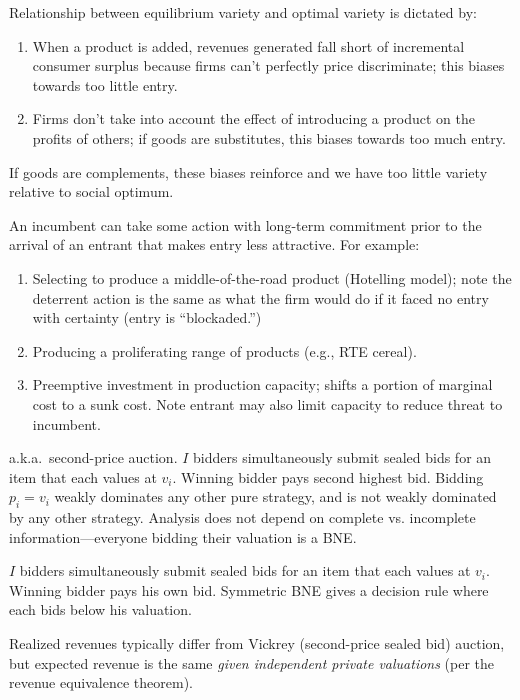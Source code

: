 \documentclass[8pt,letterpaper, landscape]{extarticle} %
\begin{document}
\begin{multicols}{3}
\begin{description}
Relationship between equilibrium variety and optimal variety is dictated by:
\begin{enumerate}
\item When a product is added, revenues generated fall short of incremental consumer surplus because firms can't perfectly price discriminate; this biases towards too little entry.
\item Firms don't take into account the effect of introducing a product on the profits of others; if goods are substitutes, this biases towards too much entry.
\end{enumerate}
If goods are complements, these biases reinforce and we have too little variety relative to social optimum.

 An incumbent can take some action with long-term commitment prior to the arrival of an entrant that makes entry less attractive. For example:
\begin{enumerate}
\item Selecting to produce a middle-of-the-road product (Hotelling model); note the deterrent action is the same as what the firm would do if it faced no entry with certainty (entry is ``blockaded.'')
\item Producing a proliferating range of products (e.g., RTE cereal).
\item Preemptive investment in production capacity; shifts a portion of marginal cost to a sunk cost. Note entrant may also limit capacity to reduce threat to incumbent.
\end{enumerate}

 a.k.a.\ second-price auction. $ I $ bidders simultaneously submit sealed bids for an item that each values at $ v_i $. Winning bidder pays second highest bid. Bidding $ p_i = v_i $ weakly dominates any other pure strategy, and is not weakly dominated by any other strategy. Analysis does not depend on complete vs. incomplete information---everyone bidding their valuation is a BNE.

 $ I $ bidders simultaneously submit sealed bids for an item that each values at $ v_i $. Winning bidder pays his own bid. Symmetric BNE gives a decision rule where each bids below his valuation.

Realized revenues typically differ from Vickrey (second-price sealed bid) auction, but expected revenue is the same \textit{given independent private valuations} (per the revenue equivalence theorem).


\end{description}
\end{multicols}
\end{document}
